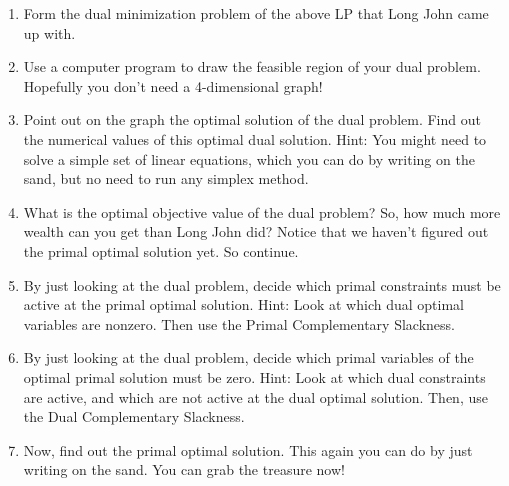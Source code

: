 \documentclass[11pt]{article}
\begin{document}
\begin{enumerate}
\begin{enumerate}
\item Form the dual minimization problem of the above LP that Long John came up with. 
\item Use a computer program to draw the feasible region of your dual problem. Hopefully you don't need a 4-dimensional graph!
\item Point out on the graph the optimal solution of the dual problem. Find out the numerical values of this optimal dual solution. Hint: You might need to solve a simple set of linear equations, which you can do by writing on the sand, but no need to run any simplex method. 
\item What is the optimal objective value of the dual problem? So, how much more wealth can you get than Long John did? Notice that we haven't figured out the primal optimal solution yet. So continue.
\item By just looking at the dual problem, decide which primal constraints must be active at the primal optimal solution. Hint: Look at which dual optimal variables are nonzero. Then use the Primal Complementary Slackness.
\item By just looking at the dual problem, decide which primal variables of the optimal primal solution
 must be zero. Hint: Look at which dual constraints are active, and which are not active at the dual optimal solution. Then, use the Dual Complementary Slackness.
\item Now, find out the primal optimal solution. This again you can do by just writing on the sand. You can grab the treasure now!
\end{enumerate}
    

\end{enumerate}
\end{document}

